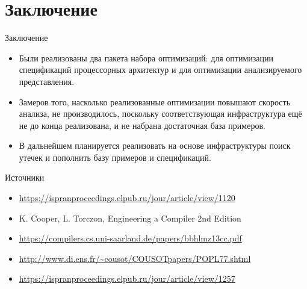 \documentclass[presentation]{beamer}
\begin{document}
\section{Заключение}
\label{sec:org8d9902e}
\begin{frame}[label={sec:org505eaac}]{Заключение}
\begin{itemize}
\item Были реализованы два пакета набора оптимизаций: для оптимизации спецификаций процессорных архитектур и для оптимизации анализируемого представления.
\item Замеров того, насколько реализованные оптимизации повышают скорость анализа, не производилось, поскольку соответствующая инфраструктура ещё не до конца реализована, и не набрана достаточная база примеров.
\item В дальнейшем планируется реализовать на основе инфраструктуры поиск утечек и пополнить базу примеров и спецификаций.
\end{itemize}
\end{frame}
\begin{frame}[label={sec:orgf210d03}]{Источники}
\begin{itemize}
\item \url{https://ispranproceedings.elpub.ru/jour/article/view/1120} \\
\item K. Cooper, L. Torczon, Engineering a Compiler 2nd Edition \\
\item \url{https://compilers.cs.uni-saarland.de/papers/bbhlmz13cc.pdf} \\
\item \url{http://www.di.ens.fr/\~cousot/COUSOTpapers/POPL77.shtml} \\
\item \url{https://ispranproceedings.elpub.ru/jour/article/view/1257}
\end{itemize}
\end{frame}
\end{document}
